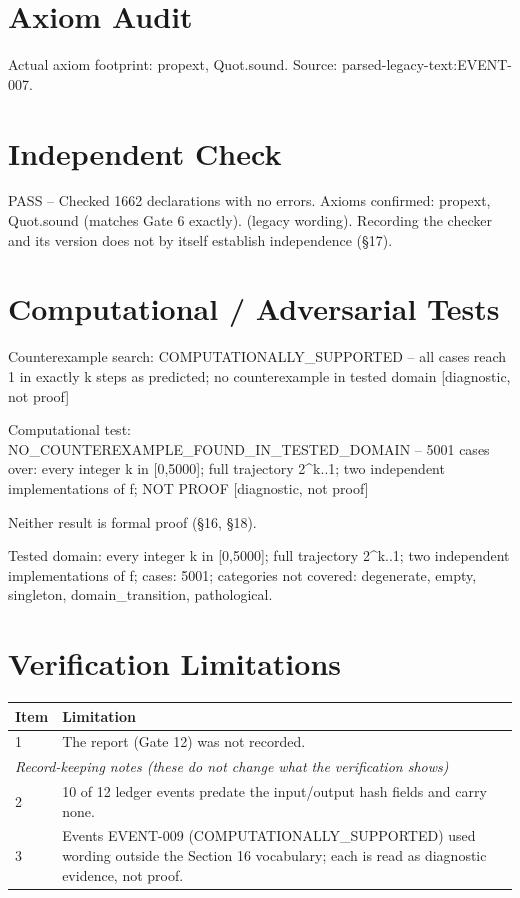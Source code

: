 \documentclass[11pt]{article}
\begin{document}
\section{Axiom Audit}
Actual axiom footprint: propext, Quot.sound.
Source: parsed-legacy-text:EVENT-007.
\section{Independent Check}
PASS -- Checked 1662 declarations with no errors. Axioms confirmed: propext, Quot.sound (matches Gate 6 exactly).  (legacy wording).
Recording the checker and its version does not by itself establish independence (\S{}17).
\section{Computational / Adversarial Tests}
Counterexample search: COMPUTATIONALLY\_SUPPORTED -- all cases reach 1 in exactly k steps as predicted; no counterexample in tested domain [diagnostic, not proof]

Computational test: NO\_COUNTEREXAMPLE\_FOUND\_IN\_TESTED\_DOMAIN -- 5001 cases over: every integer k in [0,5000]; full trajectory 2\textasciicircum{}k..1; two independent implementations of f; NOT PROOF [diagnostic, not proof]

Neither result is formal proof (\S{}16, \S{}18).

Tested domain: every integer k in [0,5000]; full trajectory 2\textasciicircum{}k..1; two independent implementations of f; cases: 5001; categories not covered: degenerate, empty, singleton, domain\_transition, pathological.
\section{Verification Limitations}
\begin{longtable}{p{}p{}}
\toprule Item & Limitation \\ \midrule \endhead
1 & The report (Gate 12) was not recorded. \\
\midrule \multicolumn{2}{l}{\textit{Record-keeping notes (these do not change what the verification shows)}} \\ \midrule
2 & 10 of 12 ledger events predate the input/output hash fields and carry none. \\
3 & Events EVENT-009 (COMPUTATIONALLY\_SUPPORTED) used wording outside the Section 16 vocabulary; each is read as diagnostic evidence, not proof. \\
\bottomrule
\end{longtable}
\end{document}
